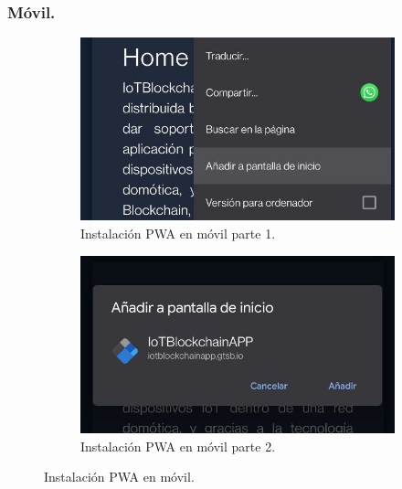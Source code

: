 \subsubsection*{Móvil.}

\begin{figure}[h!]
  \begin{subfigure}{0.5\textwidth}
    \includegraphics[width=\linewidth]{imagenes/desarrollo/web/pwa/instalacion_pwa_movil1}
    \caption{Instalación PWA en móvil parte 1.}
    \label{fig:instalacion-pwa-movil1}
  \end{subfigure}
  \begin{subfigure}{0.5\textwidth}
    \includegraphics[width=\linewidth]{imagenes/desarrollo/web/pwa/instalacion_pwa_movil2}
    \caption{Instalación PWA en móvil parte 2.}
    \label{fig:instalacion-pwa-movil2}
  \end{subfigure}
  \caption{Instalación PWA en móvil.}
  \label{fig:instalacion-pwa-movil}
\end{figure}

